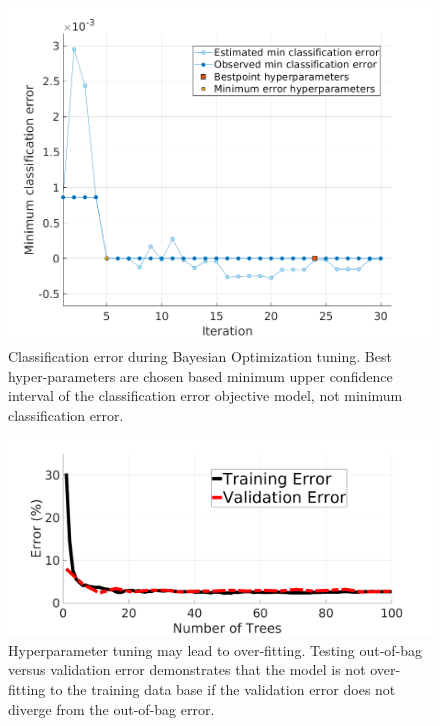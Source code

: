 \documentclass[journal,onecolumn]{IEEEtran}
\begin{document}
			\begin{figure}[H]
				\centering
				\includegraphics[width=0.75\linewidth]{figures/c2_min_class_error}
				\caption[RDF Training Classification Error]{Classification error during Bayesian Optimization tuning. Best hyper-parameters are chosen based minimum upper confidence interval of the classification error objective model, not minimum classification error.}
				\label{fig:c2_min_class_error}
			\end{figure}
		
			\begin{figure}[H]
				\centering
				\includegraphics[width=0.75\linewidth]{figures/train_vs_valid_overfit_test3}
				\caption[Training vs Validation Error]{Hyperparameter tuning may lead to over-fitting. Testing out-of-bag versus validation error demonstrates that the model is not over-fitting to the training data base if the validation error does not diverge from the out-of-bag error.}
				\label{fig:train_vs_valid_overfit_test2}
			\end{figure}
		
		
\end{document}

